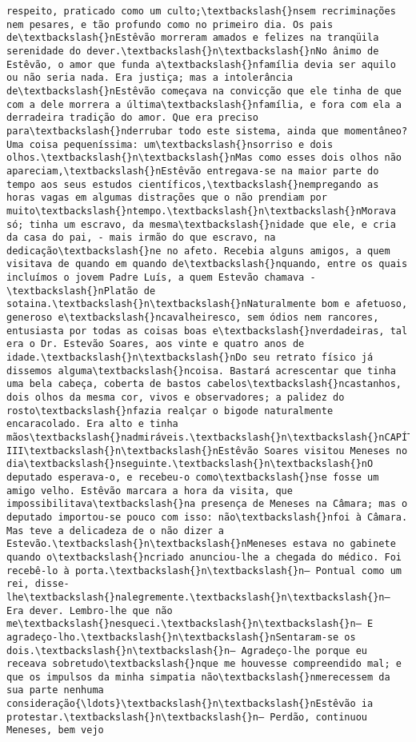 \begin{Verbatim}[commandchars=\\\{\}]
respeito, praticado como um culto;\textbackslash{}nsem recriminações nem pesares, e tão profundo como no primeiro dia. Os pais de\textbackslash{}nEstêvão morreram amados e felizes na tranqüila serenidade do dever.\textbackslash{}n\textbackslash{}nNo ânimo de Estêvão, o amor que funda a\textbackslash{}nfamília devia ser aquilo ou não seria nada. Era justiça; mas a intolerância de\textbackslash{}nEstêvão começava na convicção que ele tinha de que com a dele morrera a última\textbackslash{}nfamília, e fora com ela a derradeira tradição do amor. Que era preciso para\textbackslash{}nderrubar todo este sistema, ainda que momentâneo? Uma coisa pequeníssima: um\textbackslash{}nsorriso e dois olhos.\textbackslash{}n\textbackslash{}nMas como esses dois olhos não apareciam,\textbackslash{}nEstêvão entregava-se na maior parte do tempo aos seus estudos científicos,\textbackslash{}nempregando as horas vagas em algumas distrações que o não prendiam por muito\textbackslash{}ntempo.\textbackslash{}n\textbackslash{}nMorava só; tinha um escravo, da mesma\textbackslash{}nidade que ele, e cria da casa do pai, - mais irmão do que escravo, na dedicação\textbackslash{}ne no afeto. Recebia alguns amigos, a quem visitava de quando em quando de\textbackslash{}nquando, entre os quais incluímos o jovem Padre Luís, a quem Estevão chamava -\textbackslash{}nPlatão de sotaina.\textbackslash{}n\textbackslash{}nNaturalmente bom e afetuoso, generoso e\textbackslash{}ncavalheiresco, sem ódios nem rancores, entusiasta por todas as coisas boas e\textbackslash{}nverdadeiras, tal era o Dr. Estevão Soares, aos vinte e quatro anos de idade.\textbackslash{}n\textbackslash{}nDo seu retrato físico já dissemos alguma\textbackslash{}ncoisa. Bastará acrescentar que tinha uma bela cabeça, coberta de bastos cabelos\textbackslash{}ncastanhos, dois olhos da mesma cor, vivos e observadores; a palidez do rosto\textbackslash{}nfazia realçar o bigode naturalmente encaracolado. Era alto e tinha mãos\textbackslash{}nadmiráveis.\textbackslash{}n\textbackslash{}nCAPÍTULO III\textbackslash{}n\textbackslash{}nEstêvão Soares visitou Meneses no dia\textbackslash{}nseguinte.\textbackslash{}n\textbackslash{}nO deputado esperava-o, e recebeu-o como\textbackslash{}nse fosse um amigo velho. Estêvão marcara a hora da visita, que impossibilitava\textbackslash{}na presença de Meneses na Câmara; mas o deputado importou-se pouco com isso: não\textbackslash{}nfoi à Câmara. Mas teve a delicadeza de o não dizer a Estevão.\textbackslash{}n\textbackslash{}nMeneses estava no gabinete quando o\textbackslash{}ncriado anunciou-lhe a chegada do médico. Foi recebê-lo à porta.\textbackslash{}n\textbackslash{}n— Pontual como um rei, disse-lhe\textbackslash{}nalegremente.\textbackslash{}n\textbackslash{}n— Era dever. Lembro-lhe que não me\textbackslash{}nesqueci.\textbackslash{}n\textbackslash{}n— E agradeço-lho.\textbackslash{}n\textbackslash{}nSentaram-se os dois.\textbackslash{}n\textbackslash{}n— Agradeço-lhe porque eu receava sobretudo\textbackslash{}nque me houvesse compreendido mal; e que os impulsos da minha simpatia não\textbackslash{}nmerecessem da sua parte nenhuma consideração{\ldots}\textbackslash{}n\textbackslash{}nEstêvão ia protestar.\textbackslash{}n\textbackslash{}n— Perdão, continuou Meneses, bem vejo 
\end{Verbatim}
